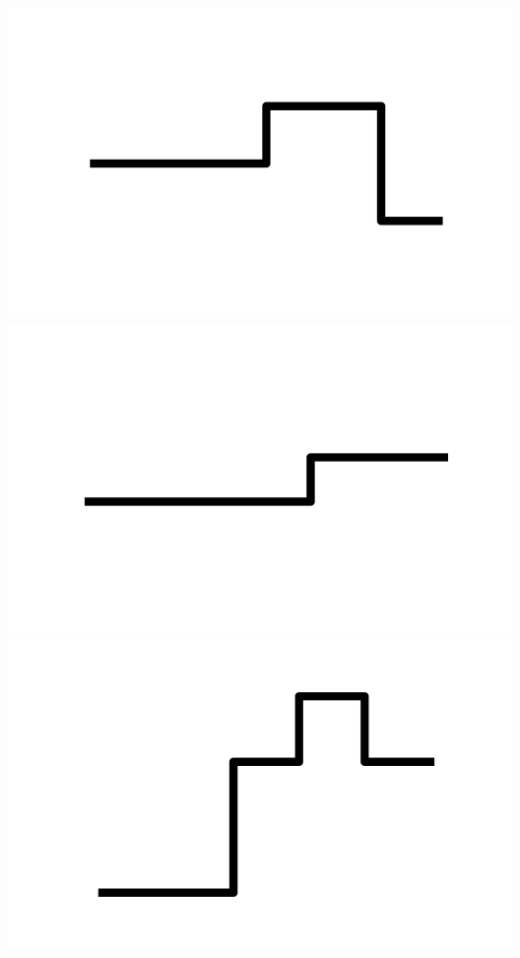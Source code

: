 \documentclass[]{report}
\begin{document}
\includegraphics[scale=.1]{pictures/17/state_cluster_shapes_7.pdf} 
\includegraphics[scale=.1]{pictures/17/state_cluster_shapes_8.pdf} 
\includegraphics[scale=.1]{pictures/17/state_cluster_shapes_9.pdf} 
\end{document}
